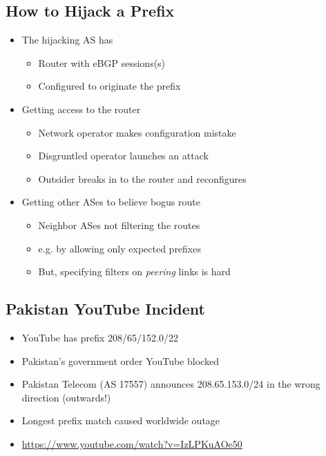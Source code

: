 \subsection{How to Hijack a Prefix}
\begin{itemize}[nosep]
    \item The hijacking AS has
          \begin{itemize}[nosep]
              \item Router with eBGP sessions(s)
              \item Configured to originate the prefix
          \end{itemize}
    \item Getting access to the router
          \begin{itemize}[nosep]
              \item Network operator makes configuration mistake
              \item Disgruntled operator launches an attack
              \item Outsider breaks in to the router and reconfigures
          \end{itemize}
    \item Getting other ASes to believe bogus route
          \begin{itemize}[nosep]
              \item Neighbor ASes not filtering the routes
              \item e.g. by allowing only expected prefixes
              \item But, specifying filters on \emph{peering} links is hard
          \end{itemize}
\end{itemize}

\subsection{Pakistan YouTube Incident}
\begin{itemize}[nosep]
    \item YouTube has prefix 208/65/152.0/22
    \item Pakistan's government order YouTube blocked
    \item Pakistan Telecom (AS 17557) announces 208.65.153.0/24 in the wrong direction (outwards!)
    \item Longest prefix match caused worldwide outage
    \item \url{https://www.youtube.com/watch?v=IzLPKuAOe50}
\end{itemize}

